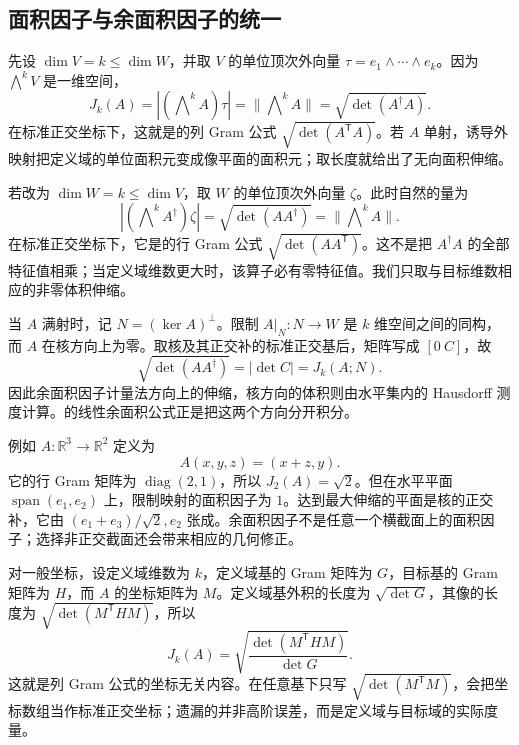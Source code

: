 \subsection{面积因子与余面积因子的统一}
\label{b1:subsec:B10403}

先设 \(\dim V=k\leq\dim W\)，并取 \(V\) 的单位顶次外向量 \(\tau=e_1\wedge\cdots\wedge e_k\)。因为 \(\bigwedge^kV\) 是一维空间，
\[
 J_k(A)=|(\bigwedge\nolimits^kA)\tau|
       =\|\bigwedge\nolimits^kA\|
       =\sqrt{\det(A^\dagger A)}.
\]
在标准正交坐标下，这就是的列 Gram 公式
\(\sqrt{\det(A^{\mathsf T}A)}\)。若 \(A\) 单射，诱导外映射把定义域的单位面积元变成像平面的面积元；取长度就给出了无向面积伸缩。

\ProseParagraphBreak

若改为 \(\dim W=k\leq\dim V\)，取 \(W\) 的单位顶次外向量 \(\zeta\)。此时自然的量为
\[
 |(\bigwedge\nolimits^kA^\dagger)\zeta|
   =\sqrt{\det(AA^\dagger)}
   =\|\bigwedge\nolimits^kA\|.
\]
在标准正交坐标下，它是的行 Gram 公式
\(\sqrt{\det(AA^{\mathsf T})}\)。这不是把 \(A^\dagger A\) 的全部特征值相乘；当定义域维数更大时，该算子必有零特征值。我们只取与目标维数相应的非零体积伸缩。

\ProseParagraphBreak

当 \(A\) 满射时，记 \(N=(\ker A)^\perp\)。限制
\(A|_N:N\rightarrow W\) 是 \(k\) 维空间之间的同构，而 \(A\) 在核方向上为零。取核及其正交补的标准正交基后，矩阵写成 \([0\ C]\)，故
\[
 \sqrt{\det(AA^\dagger)}=|\det C|=J_k(A;N).
\]
因此余面积因子计量法方向上的伸缩，核方向的体积则由水平集内的 Hausdorff 测度计算。的线性余面积公式正是把这两个方向分开积分。

\ProseParagraphBreak

例如 \(A:\mathbb R^3\rightarrow\mathbb R^2\) 定义为
\[
 A(x,y,z)=(x+z,y).
\]
它的行 Gram 矩阵为 \(\operatorname{diag}(2,1)\)，所以 \(J_2(A)=\sqrt2\)。但在水平平面 \(\operatorname{span}(e_1,e_2)\) 上，限制映射的面积因子为 \(1\)。达到最大伸缩的平面是核的正交补，它由
\((e_1+e_3)/\sqrt2,e_2\) 张成。余面积因子不是任意一个横截面上的面积因子；选择非正交截面还会带来相应的几何修正。

\ProseParagraphBreak

对一般坐标，设定义域维数为 \(k\)，定义域基的 Gram 矩阵为 \(G\)，目标基的 Gram 矩阵为 \(H\)，而 \(A\) 的坐标矩阵为 \(M\)。定义域基外积的长度为 \(\sqrt{\det G}\)，其像的长度为 \(\sqrt{\det(M^{\mathsf T}HM)}\)，所以
\begin{equation}\label{b1:eq:app-b-coordinate-jacobian}
 J_k(A)
   =\sqrt{\frac{\det(M^{\mathsf T}HM)}{\det G}}.
\end{equation}
这就是列 Gram 公式的坐标无关内容。在任意基下只写 \(\sqrt{\det(M^{\mathsf T}M)}\)，会把坐标数组当作标准正交坐标；遗漏的并非高阶误差，而是定义域与目标域的实际度量。

